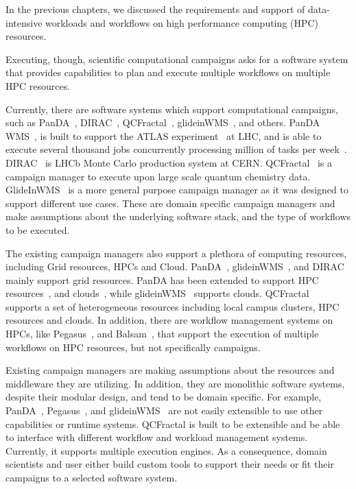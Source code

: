 \label{ch:cmanager}

In the previous chapters, we discussed the requirements and support of data-intensive workloads and workflows on high performance computing (HPC) resources.

Executing, though, scientific computational campaigns asks for a software system that provides capabilities to plan and execute multiple workflows on multiple HPC resources.


Currently, there are software systems which support computational campaigns, such as PanDA~\cite{maeno2008panda}, DIRAC~\cite{casajus2010dirac}, QCFractal~\cite{qcfractal}, glideinWMS~\cite{sfiligoi2008glidein}, and others.
PanDA WMS~\cite{maeno2008panda}, is built to support the ATLAS experiment~\cite{atlas} at LHC, and is able to execute several thousand jobs concurrently processing million of tasks per week~\cite{de2015future}.
DIRAC~\cite{tsaregorodtsev2003dirac} is LHCb Monte Carlo production system at CERN.
QCFractal~\cite{qcfractal} is a campaign manager to execute upon large scale quantum chemistry data.
GlideInWMS~\cite{sfiligoi2008glidein} is a more general purpose campaign manager as it was designed to support different use cases.
These are domain specific campaign managers and make assumptions about the underlying software stack, and the type of workflows to be executed.

The existing campaign managers also support a plethora of computing resources, including Grid resources, HPCs and Cloud.
PanDA~\cite{maeno2008panda}, glideinWMS~\cite{sfiligoi2008glidein}, and DIRAC~\cite{casajus2010dirac} mainly support grid resources.
PanDA has been extended to support HPC resources~\cite{de2015future, de2016accelerating}, and clouds~\cite{de2016accelerating}, while glideinWMS~\cite{sfiligoi2008glidein} supports clouds.
QCFractal~\cite{qcfractal} supports a set of heterogeneous resources including local campus clusters, HPC resources and clouds.
In addition, there are workflow management systems on HPCs, like Pegasus~\cite{deelman2015pegasus}, and Balsam~\cite{salim2019balsam}, that support the execution of multiple workflows on HPC resources, but not specifically campaigns.

Existing campaign managers are making assumptions about the resources and middleware they are utilizing.
In addition, they are monolithic software systems, despite their modular design, and tend to be domain specific.
For example, PanDA~\cite{maeno2008panda}, Pegasus~\cite{deelman2015pegasus}, and glideinWMS~\cite{sfiligoi2008glidein} are not easily extensible to use other capabilities or runtime systems.
QCFractal is built to be extensible and be able to interface with different workflow and workload management systems. Currently, it supports multiple execution engines.
As a consequence, domain scientists and user either build custom tools to support their needs or fit their campaigns to a selected software system.



